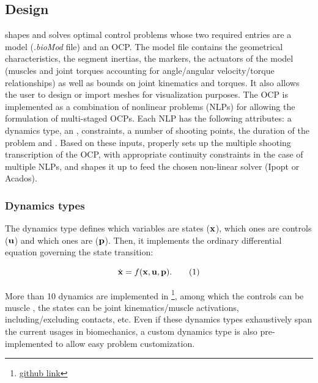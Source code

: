 \subsection{Design}
\bioptim shapes and solves optimal control problems whose two required entries are a model (.\textit{bioMod} file) and an OCP.
The model file contains the geometrical characteristics, the segment inertias, the  markers, the actuators of the model (muscles and joint torques accounting for angle/angular velocity/torque relationships) as well as bounds on joint kinematics and torques. 
It also allows the user to design or import meshes for visualization purposes.
The OCP is implemented as a combination of nonlinear problems (NLPs) for allowing the formulation of multi-staged OCPs. 
Each NLP has the following attributes: a dynamics type, an , constraints, a number of shooting points, the duration of the problem and .
Based on these inputs, \bioptim properly sets up the multiple shooting transcription of the OCP, with appropriate continuity constraints in the case of multiple NLPs, and shapes it up to feed the chosen non-linear solver (Ipopt or Acados). 

\subsubsection{Dynamics types}
The dynamics type defines which variables are states ($\mathbf{x}$), which ones are controls ($\mathbf{u}$) and which ones are  ($\mathbf{p}$).
Then, it implements the ordinary differential equation governing the state transition:

\[
\dstate = f(\state, \control, \param).
\addtag
\label{eq:state_transition}
\]

\noindent More than 10 dynamics are implemented in \bioptim \footnote{\href{https://github.com/pyomeca/bioptim/blob/master/bioptim/dynamics/dynamics_functions.py}{github link}}, among which the controls can be muscle , the states can be joint kinematics/muscle activations, including/excluding contacts, etc.
Even if these dynamics types exhaustively span the current usages in biomechanics, a custom dynamics type is also pre-implemented to allow easy problem customization.

